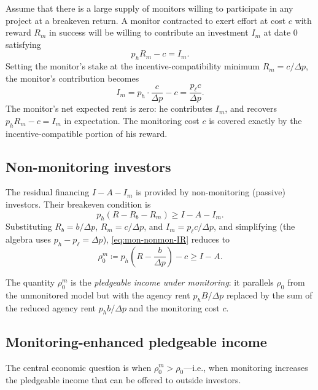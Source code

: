 \documentclass[11pt,a4paper,oneside]{book}
\def\geq{\geqslant}
\theoremstyle{plain}
\theoremstyle{definition}
\theoremstyle{remark}
\numberwithin{equation}{chapter}
\begin{document}
Assume that there is a large supply of monitors willing to participate in any project at a breakeven return.
A monitor contracted to exert effort at cost $c$ with reward $R_m$ in success will be willing to contribute an investment $I_m$ at date $0$ satisfying
\begin{equation}\label{eq:mon-breakeven}
  p_h R_m - c = I_m.
\end{equation}
Setting the monitor's stake at the incentive-compatibility minimum $R_m = c/\Delta p$, the monitor's contribution becomes
\begin{equation}\label{eq:mon-Im}
  I_m = p_h \cdot \frac{c}{\Delta p} - c = \frac{p_\ell c}{\Delta p}.
\end{equation}
The monitor's net expected rent is zero: he contributes $I_m$, and recovers $p_h R_m - c = I_m$ in expectation.
The monitoring cost $c$ is covered exactly by the incentive-compatible portion of his reward.

\subsection{Non-monitoring investors}

The residual financing $I - A - I_m$ is provided by non-monitoring (passive) investors.
Their breakeven condition is
\begin{equation}\label{eq:mon-nonmon-IR}
  p_h(R - R_b - R_m) \geq I - A - I_m.
\end{equation}
Substituting $R_b = b/\Delta p$, $R_m = c/\Delta p$, and $I_m = p_\ell c/\Delta p$, and simplifying (the algebra uses $p_h - p_\ell = \Delta p$), \eqref{eq:mon-nonmon-IR} reduces to
\begin{equation}\label{eq:mon-feasibility}
  \rho_0^{m} \coloneqq p_h\left( R - \frac{b}{\Delta p} \right) - c \geq I - A.
\end{equation}

The quantity $\rho_0^m$ is the \emph{pledgeable income under monitoring}: it parallels $\rho_0$ from the unmonitored model but with the agency rent $p_h B/\Delta p$ replaced by the sum of the reduced agency rent $p_h b/\Delta p$ and the monitoring cost $c$.

\subsection{Monitoring-enhanced pledgeable income}

The central economic question is when $\rho_0^m > \rho_0$---i.e., when monitoring increases the pledgeable income that can be offered to outside investors.
\end{document}

